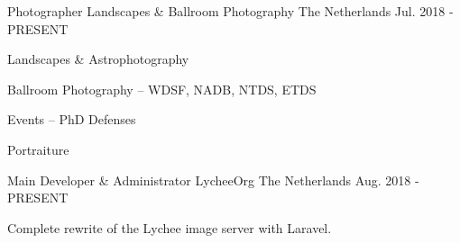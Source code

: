 \begin{cventries}
	\cventry
	{Photographer} %
	{Landscapes \& Ballroom Photography} %
	{The Netherlands} %
	{Jul. 2018 - PRESENT} %
	{
		\begin{cvitems}
			\item Landscapes \& Astrophotography
			\item Ballroom Photography -- WDSF, NADB, NTDS, ETDS
			\item Events -- PhD Defenses
			\item Portraiture
		\end{cvitems}
	}
	\cventry
	{Main Developer \& Administrator} %
	{LycheeOrg} %
	{The Netherlands} %
	{Aug. 2018 - PRESENT} %
	{
		\begin{cvitems} %
			\item {Complete rewrite of the Lychee image server with Laravel.}
		\end{cvitems}
	}

\end{cventries}
